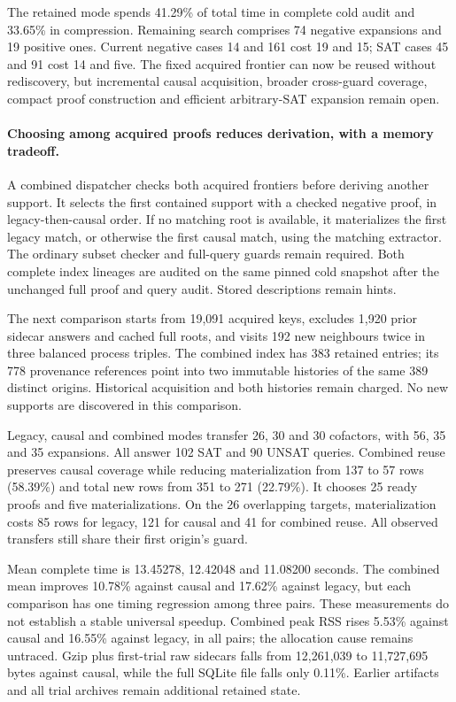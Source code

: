 \documentclass[11pt,a4paper]{article}
\numberwithin{equation}{section}
\theoremstyle{plain}
\theoremstyle{definition}
\theoremstyle{remark}
\begin{document}
The retained mode spends 41.29\% of total time in complete cold audit and
33.65\% in compression. Remaining search comprises 74 negative expansions and
19 positive ones. Current negative cases 14 and 161 cost 19 and 15; SAT cases
45 and 91 cost 14 and five. The fixed acquired frontier can now be reused without
rediscovery, but incremental causal acquisition, broader cross-guard coverage,
compact proof construction and efficient arbitrary-SAT expansion remain open.

\paragraph{Choosing among acquired proofs reduces derivation, with a memory tradeoff.}
A combined dispatcher checks both acquired frontiers before deriving another
support. It selects the first contained support with a checked negative proof,
in legacy-then-causal order. If no matching root is available, it materializes
the first legacy match, or otherwise the first causal match, using the matching
extractor. The ordinary subset checker and full-query guards remain required.
Both complete index lineages are audited on the same pinned cold snapshot after
the unchanged full proof and query audit. Stored descriptions remain hints.

The next comparison starts from 19,091 acquired keys, excludes 1,920 prior
sidecar answers and cached full roots, and visits 192 new neighbours twice in
three balanced process triples. The combined index has 383 retained entries;
its 778 provenance references point into two immutable histories of the same
389 distinct origins. Historical acquisition and both histories remain charged.
No new supports are discovered in this comparison.

Legacy, causal and combined modes transfer 26, 30 and 30 cofactors, with
56, 35 and 35 expansions. All answer 102 SAT and 90 UNSAT queries. Combined
reuse preserves causal coverage while reducing materialization from 137 to
57 rows (58.39\%) and total new rows from 351 to 271 (22.79\%). It chooses
25 ready proofs and five materializations. On the 26 overlapping targets,
materialization costs 85 rows for legacy, 121 for causal and 41 for combined
reuse. All observed transfers still share their first origin's guard.

Mean complete time is 13.45278, 12.42048 and 11.08200 seconds. The combined
mean improves 10.78\% against causal and 17.62\% against legacy, but each
comparison has one timing regression among three pairs. These measurements
do not establish a stable universal speedup. Combined peak RSS rises 5.53\%
against causal and 16.55\% against legacy, in all pairs; the allocation cause
remains untraced. Gzip plus first-trial raw sidecars falls from 12,261,039 to
11,727,695 bytes against causal, while the full SQLite file falls only 0.11\%.
Earlier artifacts and all trial archives remain additional retained state.
\end{document}
